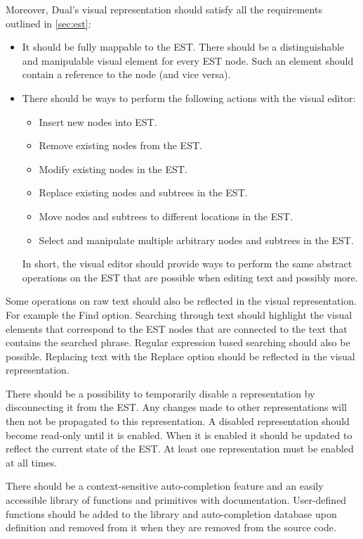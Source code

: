 Moreover, Dual's visual representation should satisfy all the requirements outlined in \ref{sec:est}:
\begin{itemize}
\item It should be fully mappable to the EST. There should be a distinguishable and manipulable visual element for every EST node. Such an element should contain a reference to the node (and vice versa).

\item There should be ways to perform the following actions with the visual editor:
    \begin{itemize}
    \item Insert new nodes into EST.
    \item Remove existing nodes from the EST.
    \item Modify existing nodes in the EST.
    \item Replace existing nodes and subtrees in the EST.
    \item Move nodes and subtrees to different locations in the EST.
    \item Select and manipulate multiple arbitrary nodes and subtrees in the EST.
    \end{itemize}
    
In short, the visual editor should provide ways to perform the same abstract operations on the EST that are possible when editing text and possibly more.
\end{itemize}

Some operations on raw text should also be reflected in the visual representation. For example the Find option. Searching through text should highlight the visual elements that correspond to the EST nodes that are connected to the text that contains the searched phrase. Regular expression based searching should also be possible. Replacing text with the Replace option should be reflected in the visual representation.

There should be a possibility to temporarily disable a representation by disconnecting it from the EST. Any changes made to other representations will then not be propagated to this representation. A disabled representation should become read-only until it is enabled. When it is enabled it should be updated to reflect the current state of the EST. At least one representation must be enabled at all times.

There should be a context-sensitive auto-completion feature and an easily accessible library of functions and primitives with documentation. User-defined functions should be added to the library and auto-completion database upon definition and removed from it when they are removed from the source code.

